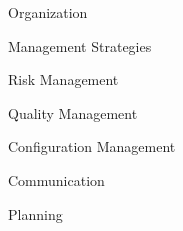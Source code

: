 \documentclass{matthijs}
\begin{document}
	\begin{hoofdstuk}{Organization}

	\end{hoofdstuk}

	\begin{hoofdstuk}{Management Strategies}

		\begin{paragraaf}{Risk Management}

		\end{paragraaf}
		
		\begin{paragraaf}{Quality Management}

		\end{paragraaf}

		\begin{paragraaf}{Configuration Management}

		\end{paragraaf}

		\begin{paragraaf}{Communication}

		\end{paragraaf}

	\end{hoofdstuk}

	\begin{hoofdstuk}{Planning}

	\end{hoofdstuk}
\end{document}

